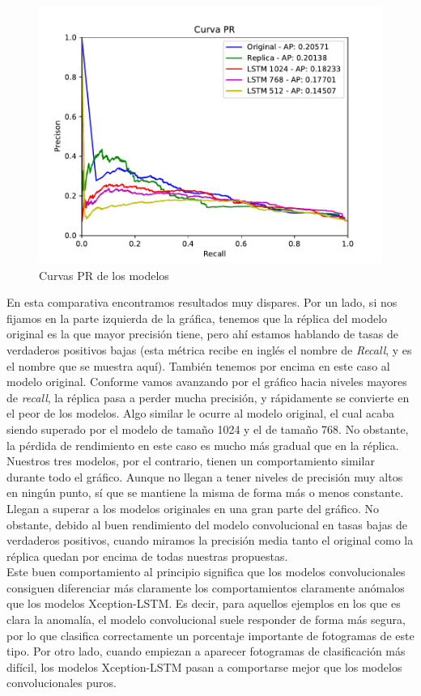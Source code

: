 \documentclass[../main.tex]{memoir}
\begin{document}
\begin{figure}[H]
  \centering
  \includegraphics[width=.8\textwidth]{images/pr_overlay.pdf}
  \caption{Curvas PR de los modelos}
  \label{fig:pr-curves-experiments}
\end{figure}

En esta comparativa encontramos resultados muy dispares. Por un lado,
si nos fijamos en la parte izquierda de la gráfica, tenemos que la
réplica del modelo original es la que mayor precisión tiene, pero ahí
estamos hablando de tasas de verdaderos positivos bajas (esta métrica
recibe en inglés el nombre de \textit{Recall}, y es el nombre que se
muestra aquí). También tenemos por encima en este caso al modelo
original. Conforme vamos avanzando por el gráfico hacia niveles
mayores de \textit{recall}, la réplica pasa a perder mucha precisión,
y rápidamente se convierte en el peor de los modelos. Algo similar le
ocurre al modelo original, el cual acaba siendo superado por el modelo
de tamaño 1024 y el de tamaño 768. No obstante, la pérdida de
rendimiento en este caso es mucho más gradual que en la réplica.\\

Nuestros tres modelos, por el contrario, tienen un comportamiento
similar durante todo el gráfico. Aunque no llegan a tener niveles de
precisión muy altos en ningún punto, sí que se mantiene la misma de
forma más o menos constante. Llegan a superar a los modelos originales
en una gran parte del gráfico. No obstante, debido al buen rendimiento
del modelo convolucional en tasas bajas de verdaderos positivos,
cuando miramos la precisión media tanto el original como la réplica
quedan por encima de todas nuestras propuestas.\\

Este buen comportamiento al principio significa que los modelos
convolucionales consiguen diferenciar más claramente los
comportamientos claramente anómalos que los modelos Xception-LSTM. Es
decir, para aquellos ejemplos en los que es clara la anomalía, el
modelo convolucional suele responder de forma más segura, por lo que
clasifica correctamente un porcentaje importante de fotogramas de este
tipo. Por otro lado, cuando empiezan a aparecer fotogramas de
clasificación más difícil, los modelos Xception-LSTM pasan a
comportarse mejor que los modelos convolucionales puros.\\
\end{document}
